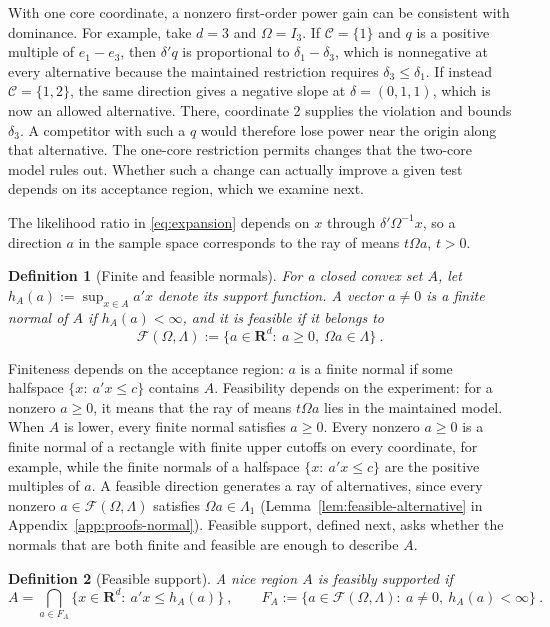 \documentclass[11pt]{article}
\numberwithin{equation}{section}
\newtheorem{definition}{Definition}
\theoremstyle{definition}
\begin{document}
With one core coordinate, a nonzero first-order power gain can be consistent with dominance. For example, take $d=3$ and $\Omega=I_3$. If $\mathcal C=\{1\}$ and $q$ is a positive multiple of $e_1-e_3$, then $\delta'q$ is proportional to $\delta_1-\delta_3$, which is nonnegative at every alternative because the maintained restriction requires $\delta_3\le\delta_1$. If instead $\mathcal C=\{1,2\}$, the same direction gives a negative slope at $\delta=(0,1,1)$, which is now an allowed alternative. There, coordinate 2 supplies the violation and bounds $\delta_3$. A competitor with such a $q$ would therefore lose power near the origin along that alternative. The one-core restriction permits changes that the two-core model rules out. Whether such a change can actually improve a given test depends on its acceptance region, which we examine next.

The likelihood ratio in \eqref{eq:expansion} depends on $x$ through $\delta'\Omega^{-1}x$, so a direction $a$ in the sample space corresponds to the ray of means $t\Omega a$, $t>0$.

\begin{definition}[Finite and feasible normals]\label{def:normals}
For a closed convex set $A$, let $h_A(a):=\sup_{x\in A}a'x$ denote its support function. A vector $a\ne0$ is a \emph{finite normal} of $A$ if $h_A(a)<\infty$, and it is \emph{feasible} if it belongs to
\[
\mathcal F(\Omega,\Lambda):=\{a\in\mathbf R^d:\ a\ge0,\ \Omega a\in\Lambda\}~.
\]
\end{definition}

Finiteness depends on the acceptance region: $a$ is a finite normal if some halfspace $\{x:\ a'x\le c\}$ contains $A$. Feasibility depends on the experiment: for a nonzero $a\ge0$, it means that the ray of means $t\Omega a$ lies in the maintained model. When $A$ is lower, every finite normal satisfies $a\ge0$. Every nonzero $a\ge0$ is a finite normal of a rectangle with finite upper cutoffs on every coordinate, for example, while the finite normals of a halfspace $\{x:\ a'x\le c\}$ are the positive multiples of $a$. A feasible direction generates a ray of alternatives, since every nonzero $a\in\mathcal F(\Omega,\Lambda)$ satisfies $\Omega a\in\Lambda_1$ (Lemma~\ref{lem:feasible-alternative} in Appendix~\ref{app:proofs-normal}). Feasible support, defined next, asks whether the normals that are both finite and feasible are enough to describe $A$.

\begin{definition}[Feasible support]\label{def:feasible-support}
A nice region $A$ is \emph{feasibly supported} if
\[
A=\bigcap_{a\in F_A}\{x\in\mathbf R^d:\ a'x\le h_A(a)\}~,
\qquad
F_A:=\{a\in\mathcal F(\Omega,\Lambda):\ a\ne0,\ h_A(a)<\infty\}~.
\]
\end{definition}
\end{document}
